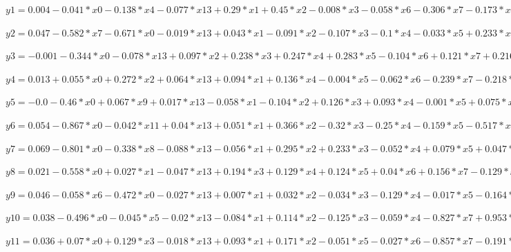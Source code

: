 \documentclass[UTF8]{ctexart}
\begin{document}
\noindent $y1 = 0.004 - 0.041 * x0 - 0.138 * x4 - 0.077 * x13 + 0.29 * x1 + 0.45 * x2 - 0.008 * x3 - 0.058 * x6 - 0.306 * x7 - 0.173 * x8 + 0.12 * x9 - 0.001 * x10 + 0.137 * x11 - 0.08 * x12 + 0.01 * x14$

\noindent $y2 = 0.047 - 0.582 * x7 - 0.671 * x0 - 0.019 * x13 + 0.043 * x1 - 0.091 * x2 - 0.107 * x3 - 0.1 * x4 - 0.033 * x5 + 0.233 * x6 - 0.101 * x9 + 0.023 * x10 + 0.046 * x11 + 0.12 * x12 - 0.001 * x14$

\noindent$y3 = -0.001 - 0.344 * x0 - 0.078 * x13 + 0.097 * x2 + 0.238 * x3 + 0.247 * x4 + 0.283 * x5 - 0.104 * x6 + 0.121 * x7 + 0.216 * x8 - 0.083 * x9 - 0.172 * x10 - 0.058 * x11 + 0.025 * x12 + 0.009 * x14$

\noindent$y4 = 0.013 + 0.055 * x0 + 0.272 * x2 + 0.064 * x13 + 0.094 * x1 + 0.136 * x4 - 0.004 * x5 - 0.062 * x6 - 0.239 * x7 - 0.218 * x8 + 0.136 * x9 + 0.149 * x10 + 0.066 * x11 - 0.062 * x12 - 0.001 * x14$

\noindent$y5 = -0.0 - 0.46 * x0 + 0.067 * x9 + 0.017 * x13 - 0.058 * x1 - 0.104 * x2 + 0.126 * x3 + 0.093 * x4 - 0.001 * x5 + 0.075 * x6 + 0.648 * x7 + 0.041 * x8 + 0.009 * x11 + 0.041 * x12 + 0.007 * x14$

\noindent$y6 = 0.054 - 0.867 * x0 - 0.042 * x11 + 0.04 * x13 + 0.051 * x1 + 0.366 * x2 - 0.32 * x3 - 0.25 * x4 - 0.159 * x5 - 0.517 * x6 - 1.359 * x7 + 1.243 * x8 + 0.169 * x9 + 0.249 * x10 - 0.004 * x14$

\noindent$y7 = 0.069 - 0.801 * x0 - 0.338 * x8 - 0.088 * x13 - 0.056 * x1 + 0.295 * x2 + 0.233 * x3 - 0.052 * x4 + 0.079 * x5 + 0.047 * x6 - 0.721 * x7 + 0.134 * x10 - 0.128 * x11 + 0.056 * x12 - 0.014 * x14$

\noindent$y8 = 0.021 - 0.558 * x0 + 0.027 * x1 - 0.047 * x13 + 0.194 * x3 + 0.129 * x4 + 0.124 * x5 + 0.04 * x6 + 0.156 * x7 - 0.129 * x8 + 0.123 * x9 - 0.089 * x10 + 0.038 * x11 + 0.051 * x12 - 0.001 * x14$

\noindent$y9 = 0.046 - 0.058 * x6 - 0.472 * x0 - 0.027 * x13 + 0.007 * x1 + 0.032 * x2 - 0.034 * x3 - 0.129 * x4 - 0.017 * x5 - 0.164 * x8 - 0.06 * x9 + 0.11 * x10 - 0.019 * x11 - 0.038 * x12 - 0.005 * x14$

\noindent$y10 = 0.038 - 0.496 * x0 - 0.045 * x5 - 0.02 * x13 - 0.084 * x1 + 0.114 * x2 - 0.125 * x3 - 0.059 * x4 - 0.827 * x7 + 0.953 * x8 + 0.056 * x9 + 0.179 * x10 - 0.145 * x11 - 0.205 * x12 - 0.002 * x14$

\noindent$y11 = 0.036 + 0.07 * x0 + 0.129 * x3 - 0.018 * x13 + 0.093 * x1 + 0.171 * x2 - 0.051 * x5 - 0.027 * x6 - 0.857 * x7 - 0.191 * x8 - 0.03 * x9 + 0.106 * x10 + 0.143 * x11 - 0.046 * x12 - 0.003 * x14$
\end{document}

